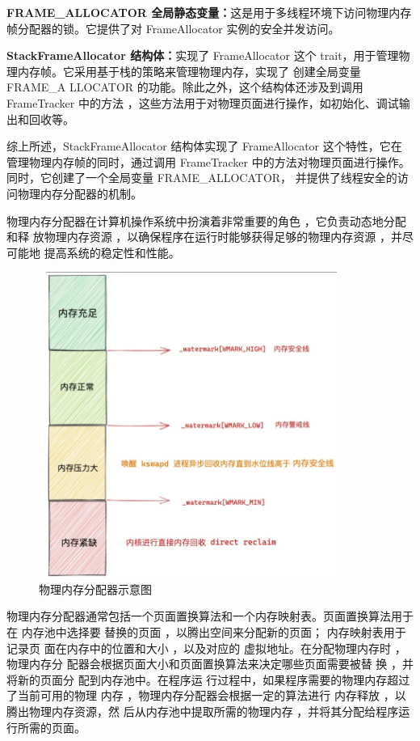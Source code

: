 	\textbf{FRAME\_ALLOCATOR 全局静态变量：}这是用于多线程环境下访问物理内存
	帧分配器的锁。它提供了对 FrameAllocator 实例的安全并发访问。
	
	\textbf{StackFrameAllocator 结构体：}实现了 FrameAllocator 这个
	 trait，用于管理物理内存帧。它采用基于栈的策略来管理物理内存，实现了
	 创建全局变量FRAME\_A
	LLOCATOR 的功能。除此之外，这个结构体还涉及到调用 FrameTracker 中的方法
	，这些方法用于对物理页面进行操作，如初始化、调试输出和回收等。
	
	综上所述，StackFrameAllocator 结构体实现了 FrameAllocator 这个特性，它在
	管理物理内存帧的同时，通过调用 FrameTracker 中的方法对物理页面进行操作。同时，它创建了一个全局变量 FRAME\_ALLOCATOR，
	并提供了线程安全的访问物理内存分配器的机制。
	
	物理内存分配器在计算机操作系统中扮演着非常重要的角色 ，它负责动态地分配和释
	放物理内存资源 ，以确保程序在运行时能够获得足够的物理内存资源 ，并尽可能地
	提高系统的稳定性和性能。
	\begin{figure}[H]
		\centering
		\includegraphics[width=10cm,height=10cm]{figures/04-03-物理内存分配器示意图.png}
		\caption{物理内存分配器示意图}
	\end{figure}   
	物理内存分配器通常包括一个页面置换算法和一个内存映射表。页面置换算法用于在
	内存池中选择要 替换的页面 ，以腾出空间来分配新的页面； 内存映射表用于记录页
	面在内存中的位置和大小 ，以及对应的 虚拟地址。在分配物理内存时 ，物理内存分
	配器会根据页面大小和页面置换算法来决定哪些页面需要被替 换 ，并将新的页面分
	配到内存池中。在程序运 行过程中，如果程序需要的物理内存超过了当前可用的物理
	内存 ，物理内存分配器会根据一定的算法进行 内存释放 ，以腾出物理内存资源，然
	后从内存池中提取所需的物理内存 ，并将其分配给程序运行所需的页面。
	

